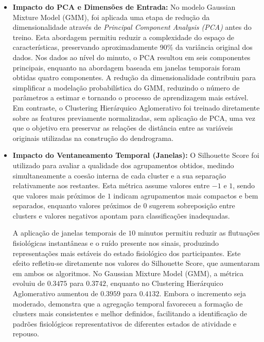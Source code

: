 \begin{itemize}
\item \textbf{Impacto do PCA e Dimensões de Entrada:} No modelo Gaussian Mixture Model (GMM), foi aplicada uma etapa de redução da dimensionalidade através de \textit{Principal Component Analysis (PCA)} antes do treino. Esta abordagem permitiu reduzir a complexidade do espaço de características, preservando aproximadamente 90\% da variância original dos dados. Nos dados ao nível do minuto, o PCA resultou em seis componentes principais, enquanto na abordagem baseada em janelas temporais foram obtidas quatro componentes. A redução da dimensionalidade contribuiu para simplificar a modelação probabilística do GMM, reduzindo o número de parâmetros a estimar e tornando o processo de aprendizagem mais estável. Em contraste, o Clustering Hierárquico Aglomerativo foi treinado diretamente sobre as features previamente normalizadas, sem aplicação de PCA, uma vez que o objetivo era preservar as relações de distância entre as variáveis originais utilizadas na construção do dendrograma.

\item \textbf{Impacto do Ventaneamento Temporal (Janelas):} O Silhouette Score foi utilizado para avaliar a qualidade dos agrupamentos obtidos, medindo simultaneamente a coesão interna de cada cluster e a sua separação relativamente aos restantes. Esta métrica assume valores entre $-1$ e $1$, sendo que valores mais próximos de $1$ indicam agrupamentos mais compactos e bem separados, enquanto valores próximos de $0$ sugerem sobreposição entre clusters e valores negativos apontam para classificações inadequadas.

A aplicação de janelas temporais de $10$ minutos permitiu reduzir as flutuações fisiológicas instantâneas e o ruído presente nos sinais, produzindo representações mais estáveis do estado fisiológico dos participantes. Este efeito refletiu-se diretamente nos valores do Silhouette Score, que aumentaram em ambos os algoritmos. No Gaussian Mixture Model (GMM), a métrica evoluiu de $0.3475$ para $0.3742$, enquanto no Clustering Hierárquico Aglomerativo aumentou de $0.3959$ para $0.4132$. Embora o incremento seja moderado, demonstra que a agregação temporal favoreceu a formação de clusters mais consistentes e melhor definidos, facilitando a identificação de padrões fisiológicos representativos de diferentes estados de atividade e repouso.


\end{itemize}
